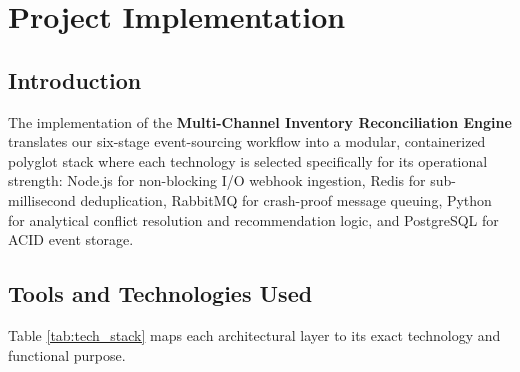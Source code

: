 \documentclass[oneside,a4paper,12pt]{report}
\begin{document}
\chapter{Project Implementation}

\section{Introduction}
The implementation of the \textbf{Multi-Channel Inventory Reconciliation Engine} translates our six-stage event-sourcing workflow into a modular, containerized polyglot stack where each technology is selected specifically for its operational strength: Node.js for non-blocking I/O webhook ingestion, Redis for sub-millisecond deduplication, RabbitMQ for crash-proof message queuing, Python for analytical conflict resolution and recommendation logic, and PostgreSQL for ACID event storage.

\section{Tools and Technologies Used}
Table \ref{tab:tech_stack} maps each architectural layer to its exact technology and functional purpose.
\end{document}
